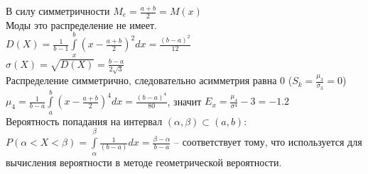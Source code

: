 \documentclass[russian, 12pt, fleqn]{article}
\begin{document}
В силу симметричности $M_e= \frac{a+b}{2} = M(x)$\\
Моды это распределение не имеет.\\
$D(X) = \frac{1}{b - 1} \int\limits_{x}^b(x - \frac{a + b}{2})^2dx = \frac{(b - a)^2}{12}$\\
$\sigma(X) = \sqrt{D(X)} = \frac{b - a}{2\sqrt{3}}$\\
Распределение симметрично, следовательно асимметрия равна 0 ($S_k = \frac{\mu_3}{\sigma_3} = 0$)\\
$\mu_4 = \frac{1}{b - a} \int\limits_{a}^{b}(x - \frac{a + b}{2})^4dx = \frac{(b - a)^4}{80}$, значит $E_x = \frac{\mu_4}{\sigma^4} - 3 = -1.2$\\
Вероятность попадания на интервал $(\alpha, \beta) \subset (a, b)$:\\
$P(\alpha<X<\beta) = \int\limits_{\alpha}^{\beta} \frac{1}{(b - a)}dx = \frac{\beta - \alpha}{b - a}$ -- соответствует тому, что используется для вычисления вероятности в методе геометрической вероятности.\\
\end{document}
